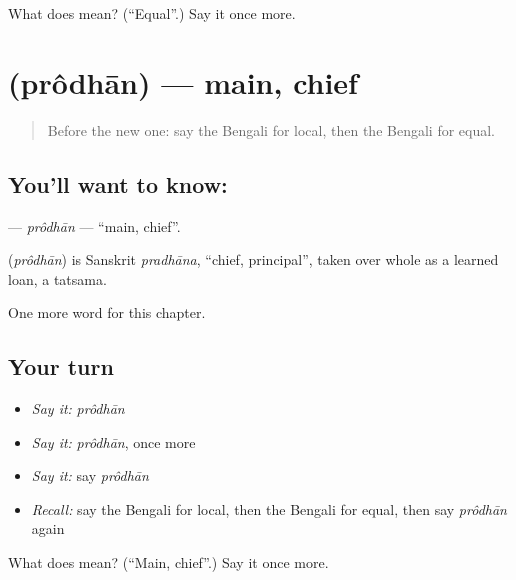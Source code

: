 \begin{tcolorbox}[breakable,colback=teal!4,colframe=teal!35!black,title={Before you move on}]
What does  mean? (\textquotedblleft{}Equal\textquotedblright{}.) Say it once more.
\end{tcolorbox}
\section[\texorpdfstring{\bn{প্রধান} (prôdhān)}{প্রধান (prôdhān)}]{ (prôdhān) — main, chief}

\label{lesson:BN-C220-prodhan}



\begin{quote}
Before the new one: say the Bengali for local, then the Bengali for equal.
\end{quote}

\subsection*{You'll want to know: }
\textbf{} — \emph{prôdhān} — \textquotedblleft{}main, chief\textquotedblright{}.

\begin{cousinweb}
\textbf{} (\emph{prôdhān}) is Sanskrit \emph{pradhāna}, \textquotedblleft{}chief, principal\textquotedblright{}, taken over whole as a learned loan, a tatsama.
\end{cousinweb}

\begin{grammarlens}[title={What you've built}]
One more word for this chapter.
\end{grammarlens}

\subsection*{Your turn}
\begin{itemize}
\raggedright
  \item \emph{Say it:} \emph{prôdhān}
  \item \emph{Say it:} \emph{prôdhān}, once more
  \item \emph{Say it:} say \emph{prôdhān}
  \item \emph{Recall:} say the Bengali for local, then the Bengali for equal, then say \emph{prôdhān} again
\end{itemize}

\begin{tcolorbox}[breakable,colback=teal!4,colframe=teal!35!black,title={Before you move on}]
What does  mean? (\textquotedblleft{}Main, chief\textquotedblright{}.) Say it once more.
\end{tcolorbox}
